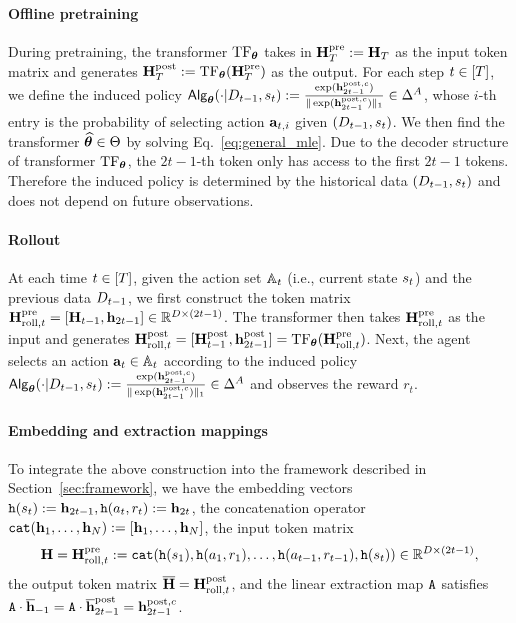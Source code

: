 \paragraph{Offline pretraining}
During pretraining, the transformer ${\rm TF}_{{\boldsymbol \theta}}$ takes in   ${\mathbf H}_{T}^{\mathrm{pre}}:={\mathbf H}_{T}$ as the input token matrix and generates ${\mathbf H}_{T}^{\mathrm{post}}:={\rm TF}_{{\boldsymbol \theta}}({\mathbf H}_{T}^{\mathrm{pre}})$ as the output. For each step $t\in[{T}]$, we define the  induced policy  ${\mathsf{Alg}}_{{\boldsymbol \theta}}(\cdot|{D}_{t-1},{s}_t):=\frac{\exp({\mathbf h}^{{\mathrm{post}},{c}}_{2t-1})}{\|\exp({\mathbf h}^{{\mathrm{post}},{c}}_{2t-1})\|_1}\in\Delta^A$, whose $i$-th entry is the probability of selecting action ${\mathbf a}_{t,i}$ given $({D}_{t-1},{s}_t)$. We then find the transformer ${\widehat{{\boldsymbol \theta}}}\in{\Theta}$ by solving Eq.~\eqref{eq:general_mle}.
Due to the decoder structure of transformer ${\rm TF}_{{\boldsymbol \theta}}$, the $2t-1$-th token only has access to the first $2t-1$ tokens. Therefore the induced policy is  determined by the historical data $({D}_{t-1},{s}_t)$ and does not depend on future observations.
\paragraph{Rollout}
At each time $t\in[{T}]$, given the action set ${\mathbb{A}}_t$ (i.e., current state ${s}_t$) and the previous data ${D}_{t-1}$, we first construct the token matrix ${\mathbf H}^{{\mathrm{pre}}}_{{\mathrm{roll}},t}=[{\mathbf H}_{t-1},{\mathbf h}_{2t-1}]\in\mathbb{R}^{D\times (2t-1)}$.   The transformer then takes ${\mathbf H}^{{\mathrm{pre}}}_{{\mathrm{roll}},t}$ as the input  and generates ${\mathbf H}^{{\mathrm{post}}}_{{\mathrm{roll}},t}=[{\mathbf H}^{{\mathrm{post}}}_{t-1},{\mathbf h}^{{\mathrm{post}}}_{2t-1}]={\rm TF}_{{\boldsymbol \theta}}({\mathbf H}^{{\mathrm{pre}}}_{{\mathrm{roll}},t})$. Next,  the agent selects an action ${\mathbf a}_t\in{\mathbb{A}}_t$ according to the induced  policy ${\mathsf{Alg}}_{{\boldsymbol \theta}}(\cdot|{D}_{t-1},{s}_t):=\frac{\exp({\mathbf h}^{{\mathrm{post}},{c}}_{2t-1})}{\|\exp({\mathbf h}^{{\mathrm{post}},{c}}_{2t-1})\|_1}\in\Delta^A$ and observes the reward $r_t$.

\paragraph{Embedding and extraction mappings}
To integrate the above construction into the  framework described in Section~\ref{sec:framework},  we have the embedding vectors ${\tt h}({s}_t):={\mathbf h}_{2t-1},{\tt h}({a}_t,{r}_t):={\mathbf h}_{2t}$,  the concatenation operator ${\tt cat}({\mathbf h}_1, \ldots, {\mathbf h}_N): = [{\mathbf h}_1, \ldots, {\mathbf h}_N]$, the input token matrix  $${\mathbf H}={\mathbf H}^{\mathrm{pre}}_{{\mathrm{roll}},t}: = {\tt cat}({\tt h}({s}_1), {\tt h}({a}_1, {r}_1), \ldots, {\tt h}({a}_{t-1}, {r}_{t-1}), {\tt h}({s}_t)) \in \mathbb{R}^{D \times (2t-1)},$$ the output token matrix $\overline{{\mathbf H}}={\mathbf H}^{\mathrm{post}}_{{\mathrm{roll}},t}$, and the linear extraction map ${\tt A}$  satisfies ${\tt A}\cdot\overline{{\mathbf h}}_{-1}={\tt A}\cdot\overline{{\mathbf h}}^{\mathrm{post}}_{2t-1}={\mathbf h}^{{\mathrm{post}},{c}}_{2t-1}$.

















